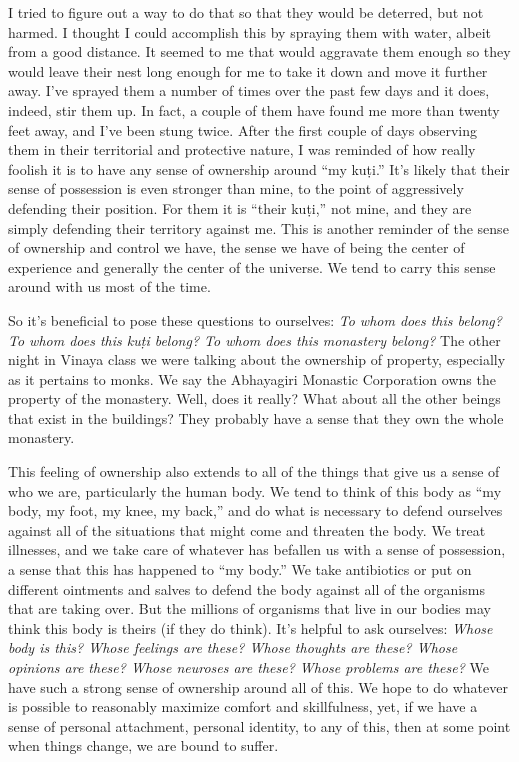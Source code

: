 I tried to figure out a way to do that so that they would be deterred, 
but not harmed. I thought I could accomplish this by spraying them with 
water, albeit from a good distance. It seemed to me that would 
aggravate them enough so they would leave their nest long enough for me 
to take it down and move it further away. I've sprayed them a number of 
times over the past few days and it does, indeed, stir them up. In 
fact, a couple of them have found me more than twenty feet away, and 
I've been stung twice. After the first couple of days observing them in 
their territorial and protective nature, I was reminded of how really 
foolish it is to have any sense of ownership around ``my kuṭi.'' It's 
likely that their sense of possession is even stronger than mine, to 
the point of aggressively defending their position. For them it is 
``their kuṭi,'' not mine, and they are simply defending their 
territory against me. This is another reminder of the sense of 
ownership and control we have, the sense we have of being the center of 
experience and generally the center of the universe. We tend to carry 
this sense around with us most of the time.

So it's beneficial to pose these questions to ourselves: \emph{To whom 
does this belong? To whom does this kuṭi belong? To whom does this 
monastery belong?} The other night in Vinaya class we were talking 
about the ownership of property, especially as it pertains to monks. We 
say the Abhayagiri Monastic Corporation owns the property of the 
monastery. Well, does it really? What about all the other beings that 
exist in the buildings? They probably have a sense that they own the 
whole monastery.

This feeling of ownership also extends to all of the things that give 
us a sense of who we are, particularly the human body. We tend to think 
of this body as ``my body, my foot, my knee, my back,'' and do what is 
necessary to defend ourselves against all of the situations that might 
come and threaten the body. We treat illnesses, and we take care of 
whatever has befallen us with a sense of possession, a sense that this 
has happened to ``my body.'' We take antibiotics or put on different 
ointments and salves to defend the body against all of the organisms 
that are taking over. But the millions of organisms that live in our 
bodies may think this body is theirs (if they do think). It's helpful 
to ask ourselves: \emph{Whose body is this? Whose feelings are these? 
Whose thoughts are these? Whose opinions are these? Whose neuroses are 
these? Whose problems are these?} We have such a strong sense of 
ownership around all of this. We hope to do whatever is possible to 
reasonably maximize comfort and skillfulness, yet, if we have a sense 
of personal attachment, personal identity, to any of this, then at some 
point when things change, we are bound to suffer.

